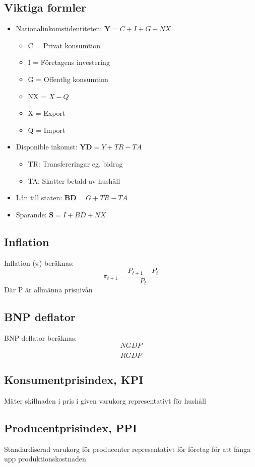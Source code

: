 \documentclass[12pt,a4paper]{article}
\begin{document}
\subsection*{Viktiga formler}
\begin{itemize}
    \item Nationalinkomstidentiteten: $\mathbf{Y} = C + I + G + NX$
    \begin{itemize}
        \item C = Privat konsumtion
        \item I = Företagens investering
        \item G = Offentlig konsumtion
        \item NX = $X - Q$
        \item X = Export
        \item Q = Import
    \end{itemize}
    \item Disponible inkomst: $\mathbf{YD} = Y + TR - TA$
    \begin{itemize}
        \item TR: Transfereringar eg. bidrag
        \item TA: Skatter betald av hushåll
    \end{itemize}
    \item Lån till staten: $\mathbf{BD} = G + TR - TA$
    \item Sparande: $\mathbf{S} = I + BD + NX$
\end{itemize}

\subsection*{Inflation}

Inflation ($\pi$) beräknas:
$$\pi_{t+1} = \frac{P_{t+1} - P_t}{P_t}$$
Där P är allmänna prisnivån

\subsection*{BNP deflator}
BNP deflator beräknas:
$$\frac{NGDP}{RGDP}$$

\subsection*{Konsumentprisindex, KPI}
Mäter skillnaden i pris i given varukorg representativt för hushåll

\subsection*{Producentprisindex, PPI}
Standardiserad varukorg för producenter representativt för företag för att fånga upp produktionskostnaden
\end{document}
